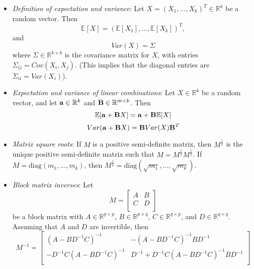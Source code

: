 \documentclass[11pt]{article}
\begin{document}
\begin{itemize}
\item \textit{Definition of expectation and variance}: Let $X = (X_1,...,X_k)^T \in \mathbb{R}^k$ be a random vector. Then 
$$\mathbb{E}[X] = (\mathbb{E}[X_1],...,\mathbb{E}[X_k])^T,$$
and
$$Var(X) = \Sigma$$
where $\Sigma \in \mathbb{R}^{k \times k}$ is the covariance matrix for $X$, with entries $\Sigma_{ij} = Cov(X_i, X_j)$. (This implies that the diagonal entries are $\Sigma_{ii} = Var(X_i)$).

\item \textit{Expectation and variance of linear combinations}: Let $X \in \mathbb{R}^k$ be a random vector, and let ${\bf a} \in \mathbb{R}^k$ and ${\bf B} \in \mathbb{R}^{m \times k}$. Then
$$\mathbb{E}[{\bf a} + {\bf B} X] = {\bf a} + {\bf B} \mathbb{E}[X]$$
$$Var({\bf a} + {\bf B} X) = {\bf B} Var(X) {\bf B}^T$$

\item \textit{Matrix square roots}: If $M$ is a positive semi-definite matrix, then $M^{\frac{1}{2}}$ is the unique positive semi-definite matrix such that $M = M^{\frac{1}{2}} M^{\frac{1}{2}}$. If $M = \text{diag}(m_1,...,m_k)$, then $M^{\frac{1}{2}} = \text{diag}(\sqrt{m_1},...,\sqrt{m_k})$.

\item \textit{Block matrix inverses}: Let 
$$M = \begin{bmatrix}
A & B \\
C & D\\
\end{bmatrix}$$
be a block matrix with $A \in \mathbb{R}^{p \times p}$, $B \in \mathbb{R}^{p \times q}$, $C \in \mathbb{R}^{q \times p}$, and $D \in \mathbb{R}^{q \times q}$. Assuming that $A$ and $D$ are invertible, then
$$M^{-1} = \begin{bmatrix}
(A - BD^{-1}C)^{-1} & -(A - BD^{-1}C)^{-1}BD^{-1} \\
-D^{-1}C(A - BD^{-1}C)^{-1} & D^{-1} + D^{-1}C(A - BD^{-1}C)^{-1}BD^{-1}\\
\end{bmatrix}$$
\end{itemize}
\end{document}
